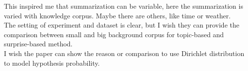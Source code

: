 \documentclass[a4paper]{article}
\begin{document}
This inspired me that summarization can be variable, here the summarization is varied with knowledge corpus. Maybe there are others, like time or weather.\\ 

The setting of experiment and dataset is clear, but I wish they can provide the comparison between small and big background corpus for topic-based and surprise-based method.\\

I wish the paper can show the reason or comparison to use Dirichlet distribution to model hypothesis probability.




\end{document}
